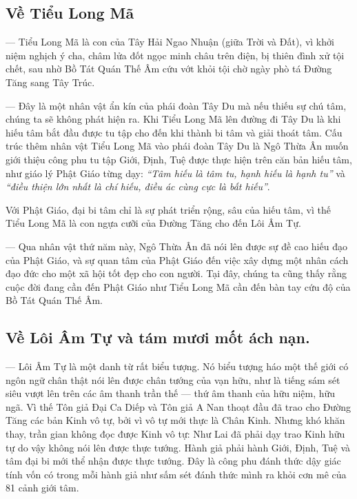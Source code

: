 \subsection{Về Tiểu Long Mã} %
\label{sub:ve_tieu_long_ma}

— Tiểu Long Mã là con của Tây Hải Ngao Nhuận (giữa Trời và Đất), vì khởi niệm nghịch ý cha, châm lửa đốt ngọc minh châu trên điện, bị thiên đình xử tội chết, sau nhờ Bồ Tát Quán Thế Âm cứu vớt khỏi tội chờ ngày phò tá Đường Tăng sang Tây Trúc.

— Đây là một nhân vật ẩn kín của phái đoàn Tây Du mà nếu thiếu sự chú tâm, chúng ta sẽ không phát hiện ra. Khi Tiểu Long Mã lên đường đi Tây Du là khi hiếu tâm bắt đầu được tu tập cho đến khi thành bi tâm và giải thoát tâm. Cấu trúc thêm nhân vật Tiểu Long Mã vào phái đoàn Tây Du là Ngô Thừa Ân muốn giới thiệu công phu tu tập Giới, Định, Tuệ được thực hiện trên căn bản hiếu tâm, như giáo lý Phật Giáo từng dạy: \emph{``Tâm hiếu là tâm tu, hạnh hiếu là hạnh tu''} và \emph{``điều thiện lớn nhất là chí hiếu, điều ác cùng cực là bất hiếu''}.

Với Phật Giáo, đại bi tâm chỉ là sự phát triển rộng, sâu của hiếu tâm, vì thế Tiểu Long Mã là con ngựa cưỡi của Đường Tăng cho đến Lôi Âm Tự.

— Qua nhân vật thứ năm này, Ngô Thừa Ân đã nói lên được sự đề cao hiếu đạo của Phật Giáo, và sự quan tâm của Phật Giáo đến việc xây dựng một nhân cách đạo đức cho một xã hội tốt đẹp cho con người. Tại đây, chúng ta cũng thấy rằng cuộc đời đang cần đến Phật Giáo như Tiểu Long Mã cần đến bàn tay cứu độ của Bồ Tát Quán Thế Âm.

\subsection{Về Lôi Âm Tự và tám mươi mốt ách nạn.} %
\label{sub:ve_loi_am_tu_va_tam_muoi_mot_ach_nan}

— Lôi Âm Tự là một danh từ rất biểu tượng. Nó biểu tượng háo một thế giới có ngôn ngữ chân thật nói lên được chân tướng của vạn hữu, như là tiếng sám sét siêu vượt lên trên các âm thanh trần thế — thứ âm thanh của hữu niệm, hữu ngã. Vì thế Tôn giả Đại Ca Diếp và Tôn giả A Nan thoạt đầu đã trao cho Đường Tăng các bản Kinh vô tự, bởi vì vô tự mới thực là Chân Kinh. Nhưng khó khăn thay, trần gian không đọc được Kinh vô tự: Như Lai đã phải dạy trao Kinh hữu tự do vậy không nói lên được thực tướng. Hành giả phải hành Giới, Định, Tuệ và tâm đại bi mới thể nhận được thực tướng. Đây là công phu đánh thức dậy giác tính vốn có trong mỗi hành giả như sấm sét đánh thức mình ra khỏi cơn mê của 81 cảnh giới tâm.

